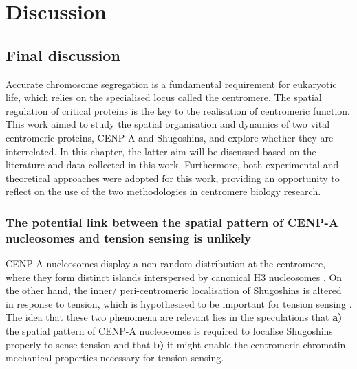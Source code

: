 \chapter{Discussion}

\section{Final discussion}

Accurate chromosome segregation is a fundamental requirement for eukaryotic life, which relies on the specialised locus called the centromere. The spatial regulation of critical proteins is the key to the realisation of centromeric function. This work aimed to study the spatial organisation and dynamics of two vital centromeric proteins, CENP-A and Shugoshins, and explore whether they are interrelated. In this chapter, the latter aim will be discussed based on the literature and data collected in this work. Furthermore, both experimental and theoretical approaches were adopted for this work, providing an opportunity to reflect on the use of the two methodologies in centromere biology research. 

\subsection{The potential link between the spatial pattern of CENP-A nucleosomes and tension sensing is unlikely}

CENP-A nucleosomes display a non-random distribution at the centromere, where they form distinct islands interspersed by canonical H3 nucleosomes \citep{Blower2002ConservedHumans, Dunleavy2011H3.3Phase., Kyriacou2018}. On the other hand, the inner/ peri-centromeric localisation of Shugoshins is altered in response to tension, which is hypothesised to be important for tension sensing \citep{Huang2007, Liu2013, Asai2020, Lee2008, Gomez2007, Eshleman2014, Nerusheva2014, Paldi2020ConvergentPericentromeres, Clarke2005, Kawashima2007}. The idea that these two phenomena are relevant lies in the speculations that \textbf{a)} the spatial pattern of CENP-A nucleosomes is required to localise Shugoshins properly to sense tension and that \textbf{b)} it might enable the centromeric chromatin mechanical properties necessary for tension sensing. 

